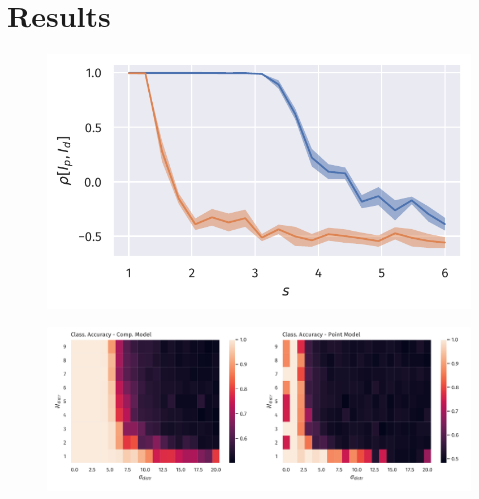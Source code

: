 \documentclass[10pt,a4paper,twocolumn]{article}
\begin{document}
		\section{Results}
		
		\begin{figure}
			\includegraphics[width=\columnwidth]{pd_corr_scaling}
		\end{figure}
		
		\begin{figure}
			\includegraphics[width=\columnwidth]{distraction_classification_compare}
		\end{figure}
		
		
		
		
		
		
		
		
		
\end{document}
